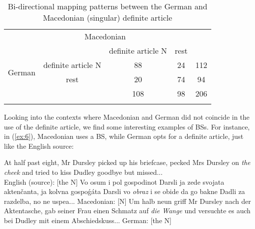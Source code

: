\documentclass[output=paper,colorlinks,citecolor=brown]{langscibook}
\begin{document}

\begin{table}
    \centering
    \begin{tabular}{ccccc}
    \lsptoprule
    \multicolumn{2}{c}{}     &  \multicolumn{2}{c}{Macedonian} &\\
     \multicolumn{2}{c}{} & definite article N & rest & \\
     \midrule
    \multirow{2}{*}{German} & definite article N & 88 & 24 & 112\\
    & rest & 20 & 74 & 94\\
    \multicolumn{2}{c}{} & 108 & 98 & 206 \\
    \lspbottomrule        
    \end{tabular}
    \caption{Bi-directional mapping patterns between the German and Macedonian (singular) definite article}
    \label{tab:1}
\end{table}

Looking into the contexts where Macedonian and German did not coincide in the use of the definite article, we find some interesting examples of BSs. For instance, in (\ref{ex:6}), Macedonian uses a BS, while German opts for a definite article, just like the English source:

\ea \label{ex:6} \ea At half past eight, Mr Dursley picked up his briefcase, pecked Mrs Dursley on \textit{the cheek} and tried to kiss Dudley goodbye but missed...\\ \hfill English (source): [the N]
\ex Vo osum i pol gospodinot Darsli ja zede svojata akten\v{c}anta, ja kolvna gospoǵ\'{a}ta 
Darsli vo \textit{obraz} i se obide da go bakne Dadli za razdelba, no ne uspea... \hfill Macedonian: [N]
\ex Um halb neun griff Mr Dursley nach der Aktentasche, gab seiner Frau einen Schmatz auf \textit{die Wange} und versuchte es auch bei Dudley mit einem Abschiedskuss... \hfill German: [the N]
\z \z
\end{document}

